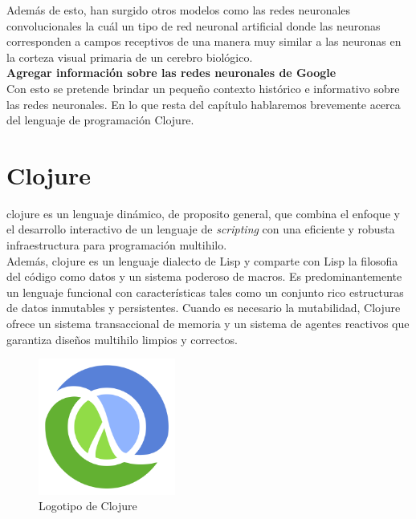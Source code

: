 Además de esto, han surgido otros modelos como las redes neuronales
convolucionales \cite{hubel1968receptive, fukushima1980neocognitron,
  behnke2003hierarchical, lecun1998gradient, graupe1988applications}
la cuál un tipo de red neuronal artificial donde las neuronas
corresponden a campos receptivos de una manera muy similar a las
neuronas en la corteza visual primaria de un cerebro biológico.\\

\textbf{Agregar información sobre las redes neuronales de Google}\\

Con esto se pretende brindar un pequeño contexto histórico e
informativo sobre las redes neuronales. En lo que resta del capítulo
hablaremos brevemente acerca del lenguaje de programación Clojure.

\section{Clojure}

\gls{clojure} es un lenguaje dinámico, de proposito general, que combina el
enfoque y el desarrollo interactivo de un lenguaje de
\textsl{scripting} con una eficiente y robusta infraestructura para
programación multihilo.\\

Además, \gls{clojure} es un lenguaje dialecto de Lisp y comparte con
Lisp la filosofia del código como datos y un sistema poderoso de
macros. Es predominantemente un lenguaje funcional con características
tales como un conjunto rico estructuras de datos inmutables y
persistentes. Cuando es necesario la mutabilidad, Clojure ofrece un
sistema transaccional de memoria y un sistema de agentes reactivos que
garantiza diseños multihilo limpios y correctos.\\

\begin{figure}[h!]
  \centering
  \includegraphics[width=0.40\textwidth]{Clojure}
  \caption{Logotipo de Clojure}
  \label{fig:clojure}
\end{figure}

